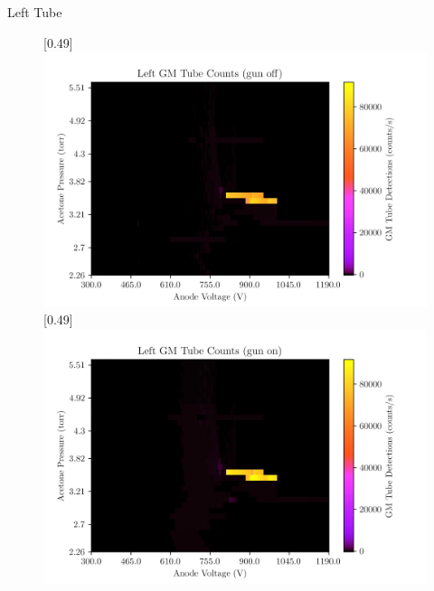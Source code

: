 \documentclass[12pt, aspectratio=169]{beamer}
\begin{document}
\begin{frame}{Left Tube}
    \begin{figure}[h!]
        \centering
        \subcaptionbox*{}[0.49\linewidth]{\includegraphics[scale=0.45]{Figs/LGMGunOff.jpg}}
        \subcaptionbox*{}[0.49\linewidth]{\includegraphics[scale=0.45]{Figs/LGMGunOn.jpg}}
    \end{figure}
\end{frame}
\end{document}
